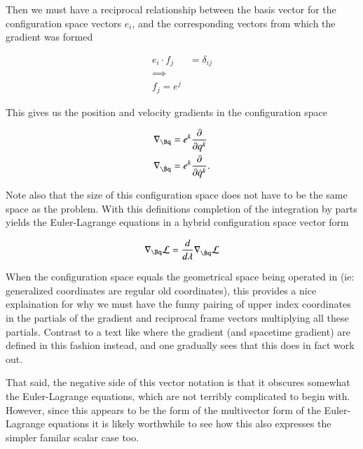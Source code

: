 \documentclass{article}
\newcommand{\LL}[0]{\mathcal{L}}
\newcommand{\qdot}[0]{\dot{q}}
\newcommand{\PD}[2]{\frac{\partial {#2}}{\partial {#1}}}
\newcommand{\grad}[0]{\nabla}
\begin{document}
Then we must have a reciprocal relationship between the basis vector for the configuration space vectors $e_i$, and the corresponding vectors
from which the gradient was formed

\begin{align*}
e_i \cdot f_j &= \delta_{i j} \\
\implies \\
f_j = e^j
\end{align*}

This gives us the position and velocity gradients in the configuration space

\begin{align}
\grad_{\Bq} &= e^k \PD{q^k}{} \\
\grad_{\dot{\Bq}} &= e^k \PD{\qdot^k}{}.
\end{align}

Note also that the size of this configuration space does not have to be the same space as the problem.  With this definitions completion of the integration
by parts yields the Euler-Lagrange equations in a hybrid configuration space vector form

\begin{align}
\grad_{\Bq} \LL = \frac{d}{d\lambda} \grad_{\dot{\Bq}} \LL
\end{align}

When the configuration space equals the geometrical space being operated in (ie: generalized coordinates are regular old coordinates), this 
provides a nice explaination for why we must have the funny pairing of upper index coordinates in the partials of the gradient and reciprocal frame
vectors multiplying all these partials.  Contrast to a text like \cite{doran2003gap} where the gradient (and spacetime gradient) are defined in this
fashion instead, and one gradually sees that this does in fact work out.

That said, the negative side of this vector notation is that 
it obscures somewhat the Euler-Lagrange equations, which are not terribly complicated to begin with.  However, since this appears to be the form
of the multivector form of the Euler-Lagrange equations it is likely worthwhile to see how this also expresses the simpler familar scalar case too.

\end{document}
